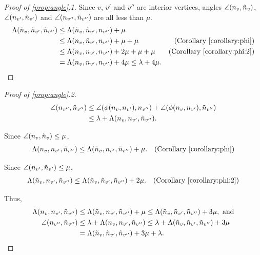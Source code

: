 \begin{proof}[Proof of \ref{prop:angle}.1]
Since $v$, $v'$ and $v''$ are interior vertices,
angles $\angle(n_v,\tilde{n}_v)$, $\angle(n_{v'}, \tilde{n}_{v'})$ 
and $\angle(n_{v''}, \tilde{n}_{v''})$ are all less than $\mu$.
\begin{align*}
\Lambda(\tilde{n}_v,\tilde{n}_{v'},\tilde{n}_{v''}) & \le \Lambda(\tilde{n}_v, \tilde{n}_{v'}, n_{v''}) + \mu 
    \\
  & \le \Lambda(n_v, \tilde{n}_{v'}, n_{v''}) + \mu + \mu 
    & \mbox{(Corollary~\ref{corollary:phi})} \\
  & \le \Lambda(n_v, n_{v'}, n_{v''}) + 2\mu + \mu + \mu 
    & \mbox{(Corollary~\ref{corollary:phi:2})} \\
  & = \Lambda(n_v, n_{v'}, n_{v''}) + 4 \mu \le \lambda + 4 \mu.
\end{align*}

\end{proof}

\begin{proof}[Proof of \ref{prop:angle}.2]

\begin{align*}
\angle(n_{v''},\tilde{n}_{v''}) & \le \angle(\phi(n_v,n_{v'}),n_{v''}) +
\angle(\phi(n_v,n_{v'}),\tilde{n}_{v''}) \\
& \le \lambda + \Lambda(n_v, n_{v'}, \tilde{n}_{v''}).
\end{align*}

Since $\angle(n_v,\tilde{n}_v) \le \mu$,
\begin{align*}
\Lambda(n_v, n_{v'}, \tilde{n}_{v''}) & 
  \le \Lambda(\tilde{n}_v, n_{v'}, \tilde{n}_{v''}) + \mu.
& \mbox{(Corollary~\ref{corollary:phi})}
\end{align*}

Since $\angle(n_{v'},\tilde{n}_{v'}) \le \mu$,
\begin{align*}
\Lambda(\tilde{n}_v, n_{v'}, \tilde{n}_{v''}) & 
\le \Lambda(\tilde{n}_v, \tilde{n}_{v'}, \tilde{n}_{v''}) + 2\mu.
& \mbox{(Corollary~\ref{corollary:phi:2})}
\end{align*}

Thus,
\begin{align*}
\Lambda(n_v, n_{v'}, \tilde{n}_{v''}) & \le \Lambda(\tilde{n}_v, n_{v'}, \tilde{n}_{v''}) + \mu
\le \Lambda(\tilde{n}_v, \tilde{n}_{v'}, \tilde{n}_{v''}) + 3\mu, \mbox{ and} \\
\angle(n_{v''},\tilde{n}_{v''}) & \le \lambda + \Lambda(n_v, n_{v'}, \tilde{n}_{v''})
  \le \lambda + \Lambda(\tilde{n}_v, \tilde{n}_{v'}, \tilde{n}_{v''}) + 3\mu \\
& = \Lambda(\tilde{n}_v, \tilde{n}_{v'}, \tilde{n}_{v''}) + 3\mu+ \lambda.
\end{align*}

\end{proof}

